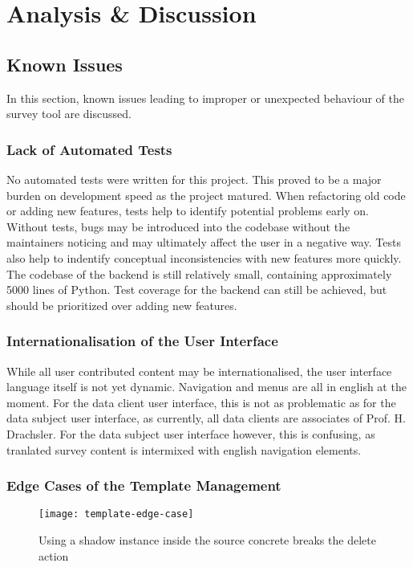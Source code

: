 \section{Analysis \& Discussion}

    \subsection{Known Issues}
    	In this section, known issues leading to improper or unexpected
    	behaviour of the survey tool are discussed.

    	\subsubsection{Lack of Automated Tests}
    		No automated tests were written for this project. This proved
    		to be a major burden on development speed as the project
    		matured. When refactoring old code or adding new features,
    		tests help to identify potential problems early on.
    		Without tests, bugs may be introduced into the codebase
    		without the maintainers noticing and may ultimately
    		affect the user in a negative way. Tests also
    		help to indentify conceptual inconsistencies
    		with new features more quickly. The codebase of the
    		backend is still relatively small, containing
    		approximately 5000 lines of Python. Test coverage for
    		the backend can still be achieved, but should be prioritized
    		over adding new features.

    	\subsubsection{Internationalisation of the User Interface}
    		While all user contributed content may be internationalised,
    		the user interface language itself is not yet dynamic.
    		Navigation and menus are all in english at the moment.
    		For the data client user interface, this is not as
    		problematic as for the data subject user interface, as 
    		currently, all data clients are associates of Prof. H. Drachsler.
    		For the data subject user interface however, this is confusing,
    		as tranlated survey content is intermixed with english
    		navigation elements.

    	\subsubsection{Edge Cases of the Template Management}
    		\begin{wrapfigure}{o}{0.5\textwidth}
    			\centering
    			\texttt{[image: template-edge-case]}
    			\caption{Using a shadow instance inside the source concrete breaks the delete action}
    			\label{fig:shadow-breaks-delete}
    		\end{wrapfigure}

